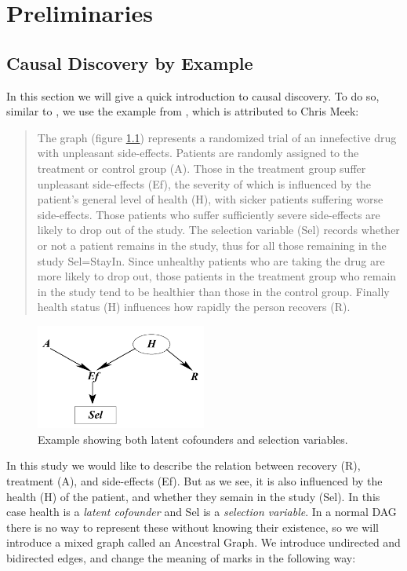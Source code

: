 \documentclass[11pt,a4paper]{report}
\begin{document}
\chapter{Preliminaries}\label{preliminaries}
\section{Causal Discovery by Example}\label{sec:example}
In this section we will give a quick introduction to causal discovery. To
do so, similar to \cite{zhangCompletenessOrientationRules2008}, we use the
example from \cite{richardsonChainGraphsSymmetric1998}, which is
attributed to Chris Meek:

\begin{quote}
  The graph (figure \ref{fig:example}) represents a randomized trial of an
  innefective drug with unpleasant side-effects. Patients are randomly
  assigned to the treatment or control group (A). Those in the treatment
  group suffer unpleasant side-effects (Ef), the severity of which is
  influenced by the patient's general level of health (H), with sicker
  patients suffering worse side-effects. Those patients who suffer
  sufficiently severe side-effects are likely to drop out of the study.
  The selection variable (Sel) records whether or not a patient remains in
  the study, thus for all those remaining in the study Sel=StayIn. Since
  unhealthy patients who are taking the drug are more likely to drop out,
  those patients in the treatment group who remain in the study tend to be
  healthier than those in the control group. Finally health status (H)
  influences how rapidly the person recovers (R).
\end{quote}

\begin{figure}
  \centering
  \includegraphics[width=0.5\textwidth]{imgs/example1.png}
  \caption{Example showing both latent cofounders and selection variables.}
  \label{fig:example}
\end{figure}

In this study we would like to describe the relation between recovery (R),
treatment (A), and side-effects (Ef). But as we see, it is also influenced
by the health (H) of the patient, and whether they semain in the study
(Sel). In this case health is a \emph{latent cofounder} and Sel is a
\emph{selection variable}. In a normal DAG there is no way to represent
these without knowing their existence, so we will introduce a mixed graph
called an Ancestral Graph. We introduce undirected and bidirected edges,
and change the meaning of marks in the following way:
\end{document}
